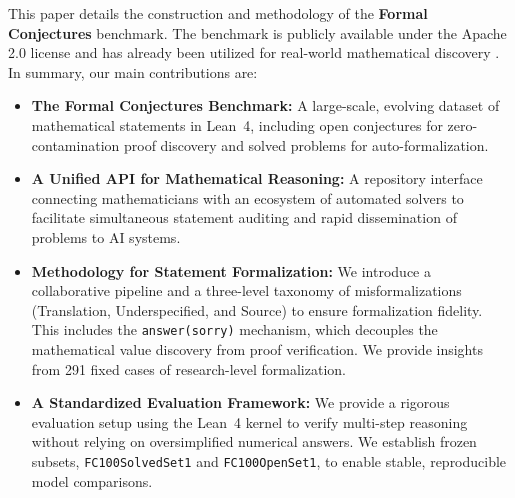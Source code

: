 This paper details the construction and methodology of the \textbf{Formal Conjectures} benchmark.
The benchmark is publicly available under the Apache 2.0 license and has already been utilized for real-world mathematical discovery \citep{alexeev25, DMProverAgent26}. In summary, our main contributions are:
\begin{itemize}
    \item \textbf{The Formal Conjectures Benchmark:} A large-scale, evolving dataset of \fcCountTotal{} mathematical statements in Lean~4, including \fcCountResearchOpen{} open conjectures for zero-contamination proof discovery and \fcCountResearchSolved{} solved problems for auto-formalization.
    \item \textbf{A Unified API for Mathematical Reasoning:} A repository interface connecting mathematicians with an ecosystem of automated solvers to facilitate simultaneous statement auditing and rapid dissemination of problems to AI systems.
    \item \textbf{Methodology for Statement Formalization:} We introduce a collaborative pipeline and a three-level taxonomy of misformalizations (Translation, Underspecified, and Source) to ensure formalization fidelity. This includes the \texttt{answer(sorry)} mechanism, which decouples the mathematical value discovery from proof verification. We provide insights from 291 fixed cases of research-level formalization.
    \item \textbf{A Standardized Evaluation Framework:} We provide a rigorous evaluation setup using the Lean~4 kernel to verify multi-step reasoning without relying on oversimplified numerical answers. We establish frozen subsets, \texttt{FC100SolvedSet1} and \texttt{FC100OpenSet1}, to enable stable, reproducible model comparisons.
\end{itemize}
